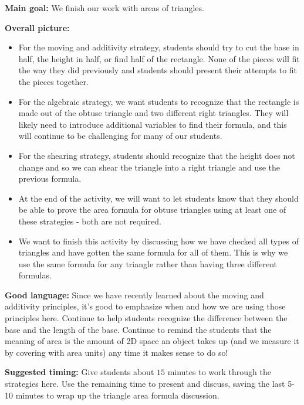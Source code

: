 \documentclass[nooutcomes,noauthor]{ximera}
\begin{document}
\newpage

\begin{instructorNotes} 

{\bf Main goal:} We finish our work with areas of triangles.

{\bf Overall picture:} 
\begin{itemize}
	\item For the moving and additivity strategy, students should try to cut the base in half, the height in half, or find half of the rectangle. None of the pieces will fit the way they did previously and students should present their attempts to fit the pieces together.
	\item For the algebraic strategy, we want students to recognize that the rectangle is made out of the obtuse triangle and two different right triangles. They will likely need to introduce additional variables to find their formula, and this will continue to be challenging for many of our students.
	\item For the shearing strategy, students should recognize that the height does not change and so we can shear the triangle into a right triangle and use the previous formula. 
	\item At the end of the activity, we will want to let students know that they should be able to prove the area formula for obtuse triangles using at least one of these strategies - both are not required.
	\item We want to finish this activity by discussing how we have checked all types of triangles and have gotten the same formula for all of them. This is why we use the same formula for any triangle rather than having three different formulas.
\end{itemize}


{\bf Good language:} Since we have recently learned about the moving and additivity principles, it's good to emphasize when and how we are using those principles here. Continue to help students recognize the difference between the base and the length of the base. Continue to remind the students that the meaning of area is the amount of 2D space an object takes up (and we measure it by covering with area units) any time it makes sense to do so!



{\bf Suggested timing:} Give students about $15$ minutes to work through the strategies here. Use the remaining time to present and discuss, saving the last 5-10 minutes to wrap up the triangle area formula discussion.



\end{instructorNotes}
\end{document}
